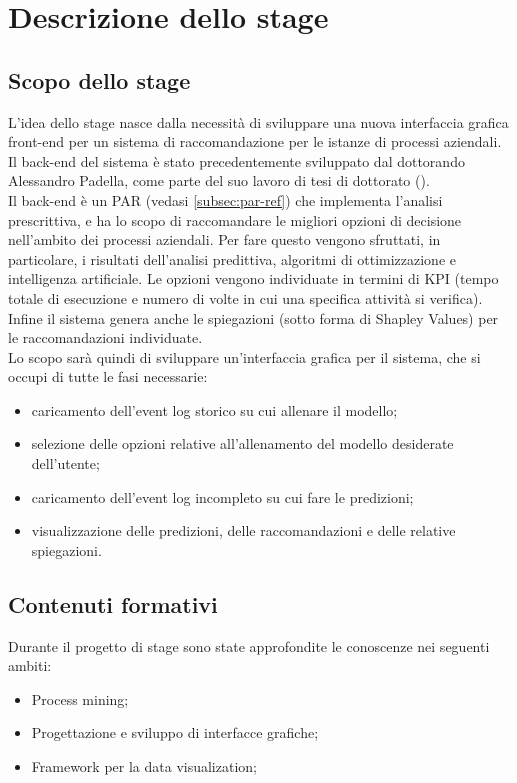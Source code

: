 
\chapter{Descrizione dello stage}
\label{cap2}
\section{Scopo dello stage}
L'idea dello stage nasce dalla necessità di sviluppare una nuova interfaccia grafica front-end per un sistema di raccomandazione per le istanze di processi aziendali.
\\
Il back-end del sistema è stato precedentemente sviluppato dal dottorando Alessandro Padella, come parte del suo lavoro di tesi di dottorato (\cite{paper-padella}). 
\\
Il back-end è un PAR (vedasi \autoref{subsec:par-ref}) che implementa l'analisi prescrittiva, e ha lo scopo di raccomandare le migliori opzioni di decisione nell'ambito dei processi aziendali. Per fare questo vengono sfruttati, in particolare, i risultati dell'analisi predittiva, algoritmi di ottimizzazione e intelligenza artificiale. Le opzioni vengono individuate in termini di KPI (tempo totale di esecuzione e numero di volte in cui una specifica attività si verifica). Infine il sistema genera anche le spiegazioni (sotto forma di Shapley Values) per le raccomandazioni individuate.
\\
Lo scopo sarà quindi di sviluppare un'interfaccia grafica per il sistema, che si occupi di tutte le fasi necessarie: 
\begin{itemize}
\item caricamento dell'event log storico su cui allenare il modello;
\item selezione delle opzioni relative all'allenamento del modello desiderate dell'utente;
\item caricamento dell'event log incompleto su cui fare le predizioni;
\item visualizzazione delle predizioni, delle raccomandazioni e delle relative spiegazioni.
\end{itemize}

\section{Contenuti formativi}
Durante il progetto di stage sono state approfondite le conoscenze nei seguenti ambiti:
\begin{itemize}
\item Process mining; 
\item Progettazione e sviluppo di interfacce grafiche;
\item Framework per la data visualization;
\end{itemize}

